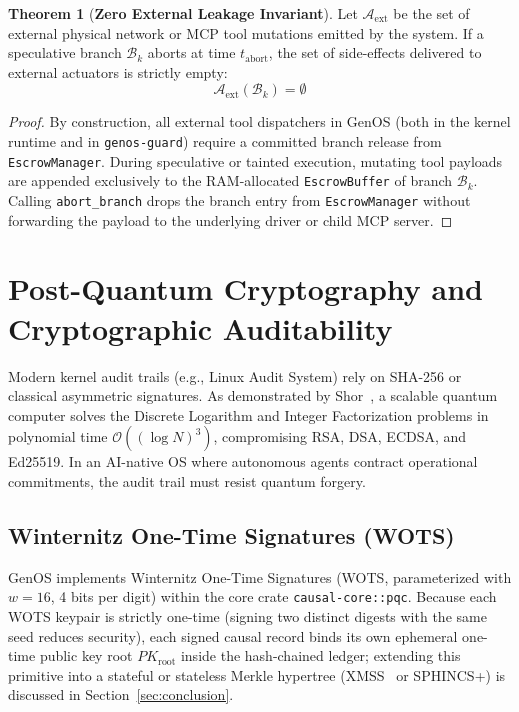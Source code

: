 \documentclass[10pt,journal,compsoc]{IEEEtran}
\theoremstyle{definition}
\newtheorem{theorem}{Theorem}
\begin{document}
\begin{theorem}[\textbf{Zero External Leakage Invariant}]
Let $\mathcal{A}_{\text{ext}}$ be the set of external physical network or MCP tool mutations emitted by the system. If a speculative branch $\mathcal{B}_k$ aborts at time $t_{\text{abort}}$, the set of side-effects delivered to external actuators is strictly empty:
$$\mathcal{A}_{\text{ext}}(\mathcal{B}_k) = \emptyset$$
\end{theorem}
\begin{proof}
By construction, all external tool dispatchers in GenOS (both in the kernel runtime and in \texttt{genos-guard}) require a committed branch release from \texttt{EscrowManager}. During speculative or tainted execution, mutating tool payloads are appended exclusively to the RAM-allocated \texttt{EscrowBuffer} of branch $\mathcal{B}_k$. Calling \texttt{abort\_branch} drops the branch entry from \texttt{EscrowManager} without forwarding the payload to the underlying driver or child MCP server.
\end{proof}

\section{Post-Quantum Cryptography and Cryptographic Auditability}
\label{sec:pqc}

Modern kernel audit trails (e.g., Linux Audit System) rely on SHA-256 or classical asymmetric signatures. As demonstrated by Shor~\cite{shor1994algorithms}, a scalable quantum computer solves the Discrete Logarithm and Integer Factorization problems in polynomial time $\mathcal{O}((\log N)^3)$, compromising RSA, DSA, ECDSA, and Ed25519. In an AI-native OS where autonomous agents contract operational commitments, the audit trail must resist quantum forgery.

\subsection{Winternitz One-Time Signatures (WOTS)}
GenOS implements Winternitz One-Time Signatures (WOTS, parameterized with $w = 16$, 4 bits per digit) within the core crate \texttt{causal-core::pqc}. Because each WOTS keypair is strictly one-time (signing two distinct digests with the same seed reduces security), each signed causal record binds its own ephemeral one-time public key root $PK_{\text{root}}$ inside the hash-chained ledger; extending this primitive into a stateful or stateless Merkle hypertree (XMSS~\cite{buchmann2011xmss} or SPHINCS+) is discussed in Section~\ref{sec:conclusion}.
\end{document}
